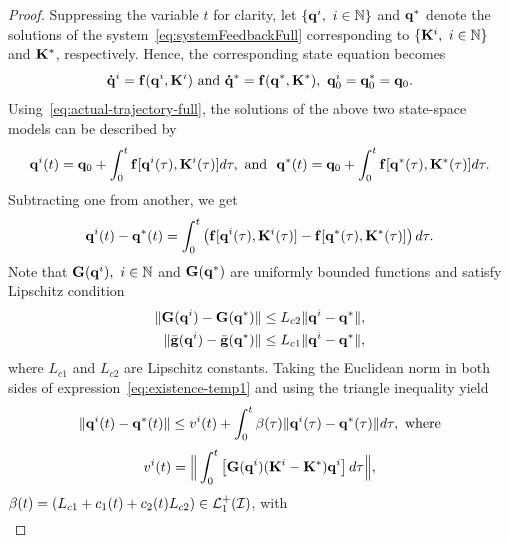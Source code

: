 \documentclass[
12pt,draftcls,onecolumn%
]{IEEEtran}
\begin{document}
\begin{proof}
Suppressing the variable $t$ for clarity, let $\{{\bf q}^i,~i\in \mathbb{N}\}$ and ${\bf q}^*$ denote the  solutions of the system~\eqref{eq:systemFeedbackFull} corresponding to $\{{\bf K}^i,~i\in \mathbb{N}\}$ and ${\bf K}^*$, respectively. Hence, the corresponding state equation becomes 
\begin{align*}
{\bf \dot q}^i = {\bf f}({\bf q}^i,{\bf K}^i)~\text{and}~
{\bf \dot q}^* = {\bf f}({\bf q}^*,{\bf K}^*),~{\bf q}^i_0={\bf q}^*_0={\bf q}_0.
\end{align*}
%
Using~\eqref{eq:actual-trajectory-full}, the solutions of the above two state-space models can be described by
\begin{equation*}
\begin{split}
{\bf q}^i(t) = {\bf q}_0 + \int_{0}^{t}{\bf f}[{\bf q}^i(\tau),{\bf K}^i(\tau)]d\tau,~\text{and}~~
{\bf q}^*(t)= {\bf q}_0 + \int_{0}^{t}{\bf f}[{\bf q}^*(\tau),{\bf K}^*(\tau)]d\tau.
\end{split}
\end{equation*}
%
Subtracting one from another, we get
\begin{align}
{\bf q}^i(t)-{\bf q}^*(t) = \int_{0}^t\left({\bf f}[{\bf q}^i(\tau),{\bf K}^i(\tau)]- {\bf f}[{\bf q}^*(\tau),{\bf K}^*(\tau)]\right)d\tau.
\label{eq:existence-temp1}
\end{align}
Note that ${\bf G}({\bf q}^i),~i\in \mathbb{N}$ and ${\bf G}({\bf q}^*)$ are uniformly bounded functions and satisfy Lipschitz condition
\begin{align*}
\|{\bf G}({\bf q}^i)-{\bf G}({\bf q}^*)\|&\leq L_{c2}\|{\bf q}^i-{\bf q}^*\|,\\
\|\bar{{\bf g}}({\bf q}^i)-\bar{{\bf g}}({\bf q}^*)\|&\leq L_{c1}\|{\bf q}^i-{\bf q}^*\|,\\
\end{align*}
where $L_{c1}$ and $L_{c2}$ are Lipschitz constants. Taking the Euclidean norm in both sides of expression~\eqref{eq:existence-temp1} and using the triangle inequality yield
\begin{align*}
\|{\bf q}^i(t)-{\bf q}^*(t)\| \leq v^i(t)+\int_{0}^t\beta(\tau)\|{\bf q}^i(\tau)-{\bf q}^*(\tau)\|d\tau,~\text{where}
\end{align*}
%
\begin{equation*}
v^i(t) = \Big\Vert\int_{0}^t\left[{\bf G}({\bf q}^i)({\bf K}^i-{\bf K}^*){\bf q}^i\right]d\tau\Big\Vert,
\end{equation*}
${\beta}(t) = (L_{c1} + c_1(t) + c_2(t)L_{c2}) \in{\cal L}_1^{+}({\cal I})$, with 
\begin{align*}

\end{align*}
\end{proof}
\end{document}
